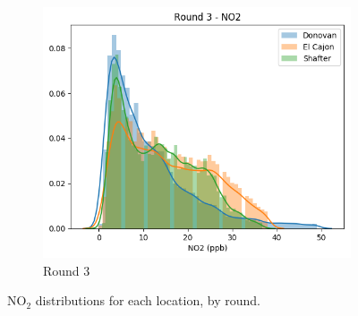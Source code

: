 \documentclass[journal abbreviation, manuscript]{copernicus}
\newcommand{\textus}[1]{$_{\text{#1}}$}
\begin{document}
\begin{figure}[H]
\begin{subfigure}{0.32\textwidth}
\includegraphics[width=\textwidth]{results/distributions/round3_no2.png}
\caption{Round 3}
\end{subfigure}
\caption{NO\textus{2} distributions for each location, by round.}
\label{fig:no2-rounds}
\end{figure}

\iffalse
\end{document}
